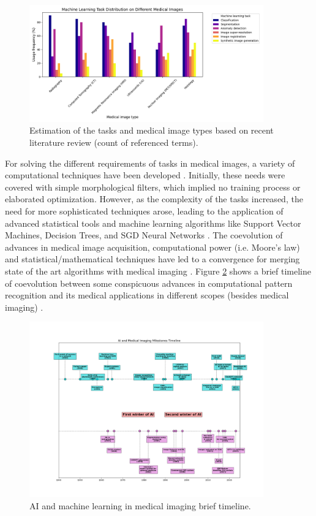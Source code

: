 \begin{figure}
  \centering
  \includegraphics[width=0.9\textwidth]{Cap1/Figures/comparative-tasks-and-medical-image-types.png}
  \caption{Estimation of the tasks and medical image types based on
  recent literature review (count of referenced terms).}
  \label{fig:medical_image_analysis}
\end{figure}

For solving the different requirements of tasks in medical images, a
variety of computational techniques have been developed
\cite{Zhou2021}. Initially, these needs were covered with simple
morphological filters, which implied no training process or
elaborated optimization. However, as the complexity of the tasks
increased, the need for more sophisticated techniques arose, leading
to the application of advanced statistical tools and machine learning
algorithms like Support Vector Machines, Decision Trees, and SGD
Neural Networks \cite{Avanzo2024}. The coevolution of advances in medical image
acquisition, computational power (i.e. Moore's law) and
statistical/mathematical techniques have led to a convergence for
merging state of the art algorithms with medical imaging
\cite{Shalf2020}. Figure \ref{fig:medical-ai-timeline} shows a brief
timeline of coevolution between some conspicuous advances in
computational pattern recognition and its medical applications in
different scopes (besides medical imaging) \cite{Avanzo2024}.

\begin{figure}
  \centering
  \includegraphics[trim={5cm 2cm 5cm
  0},width=0.9\textwidth]{Cap1/Figures/medical-ai-timeline.png}
  \caption{AI and machine learning in medical imaging brief timeline.}
  \label{fig:medical-ai-timeline}
\end{figure}

